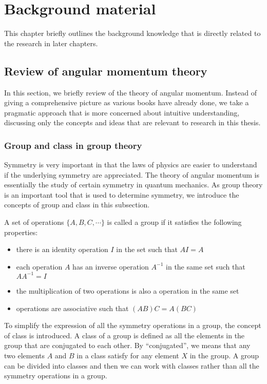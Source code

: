
\chapter{Background material}
\label{ch:background}
This chapter  briefly outlines the background knowledge that is directly related to the research in later chapters.


\section{Review of angular momentum theory}
\label{sec:angularMomentum}

In this section, we briefly review of the theory of angular momentum. Instead of giving a comprehensive 
picture as various books\cite{edmonds-book, rose-book, brink-book, zare-book, silver-book, kleinman-book, Varshalovich-book, sakurai-book, RotSpect} have already done, we take a pragmatic approach that is more concerned about intuitive 
understanding, discussing only the concepts and ideas that are relevant to research in this thesis. 

\subsection{Group and class in group theory}  
\label{sec:groupTheory}

Symmetry is very important in that the laws of physics are easier to understand if the underlying symmetry are 
appreciated. The theory of angular momentum is essentially the study of certain symmetry in quantum mechanics. 
As group theory is an important tool that is used to determine symmetry, we introduce the concepts of group
and class in this subsection.

A set of operations $\{ A, B, C, \cdots \}$ is called a group if it satisfies the following properties:
\begin{itemize}
\item there is an identity operation $I$ in the set such that $A I = A$
\item  each operation $A$ has an inverse operation $A^{-1}$ in the same set such that $A A^{-1} = I$
\item  the multiplication of two operations is also a operation in the same set
\item  operations are associative such that $(AB)C = A(BC)$
\end{itemize}
To simplify the expression of all the symmetry operations in a group, the concept of class is introduced. A class of a 
group is defined as all the elements in the group that are conjugated to each other. By ``conjugated'', we means that 
 any two elements $A$ and $B$ in a class satisfy
for any element $X$ in the group. A group can be divided into classes and then we can work with classes rather than 
all the symmetry operations in a group. 

